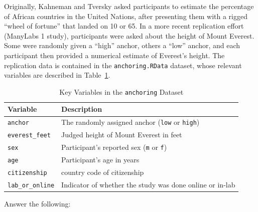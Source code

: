 \documentclass[12pt]{article}
\begin{document}
Originally, Kahneman and Tversky asked participants to estimate the percentage of African countries in the United Nations, after presenting them with a rigged “wheel of fortune” that landed on 10 or 65. In a more recent replication effort (ManyLabs 1 study), participants were asked about the height of Mount Everest. Some were randomly given a “high” anchor, others a “low” anchor, and each participant then provided a numerical estimate of Everest’s height. The replication data is contained in the \texttt{anchoring.RData} dataset, whose relevant variables are described in Table~\ref{tab:anchoring-data}.

\begin{table}[h]
\centering
\caption{Key Variables in the \texttt{anchoring} Dataset}\label{tab:anchoring-data}
\begin{tabular}{ll}
\toprule
\textbf{Variable} & \textbf{Description} \\
\midrule
\texttt{anchor}       & The randomly assigned anchor (\texttt{low} or \texttt{high}) \\
\texttt{everest\_feet}& Judged height of Mount Everest in feet \\
\texttt{sex}          & Participant’s reported sex (\texttt{m} or \texttt{f}) \\
\texttt{age}          & Participant’s age in years \\
\texttt{citizenship}  & country code of citizenship \\
\texttt{lab\_or\_online} & Indicator of whether the study was done online or in-lab \\
\bottomrule
\end{tabular}
\end{table}

Answer the following:
\end{document}
